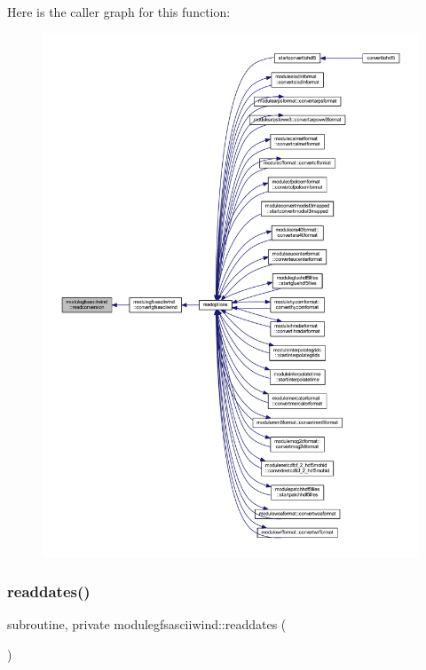 Here is the caller graph for this function\+:\nopagebreak
\begin{figure}[H]
\begin{center}
\leavevmode
\includegraphics[width=350pt]{namespacemodulegfsasciiwind_a2ae7830d5f79fbdaea50e4f86eef0d4b_icgraph}
\end{center}
\end{figure}
\mbox{\label{namespacemodulegfsasciiwind_ab9051f99673c32b2f6b1020ab37aa9c1}} 
\subsubsection{\texorpdfstring{readdates()}{readdates()}}
{\footnotesize\ttfamily subroutine, private modulegfsasciiwind\+::readdates (\begin{DoxyParamCaption}{ }\end{DoxyParamCaption})\hspace{0.3cm}{\ttfamily [private]}}


